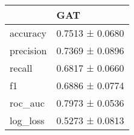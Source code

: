 \begin{tabular}{ll}
\toprule
 & GAT \\
\midrule
accuracy & 0.7513 ± 0.0680 \\
precision & 0.7369 ± 0.0896 \\
recall & 0.6817 ± 0.0660 \\
f1 & 0.6886 ± 0.0774 \\
roc_auc & 0.7973 ± 0.0536 \\
log_loss & 0.5273 ± 0.0813 \\
\bottomrule
\end{tabular}
